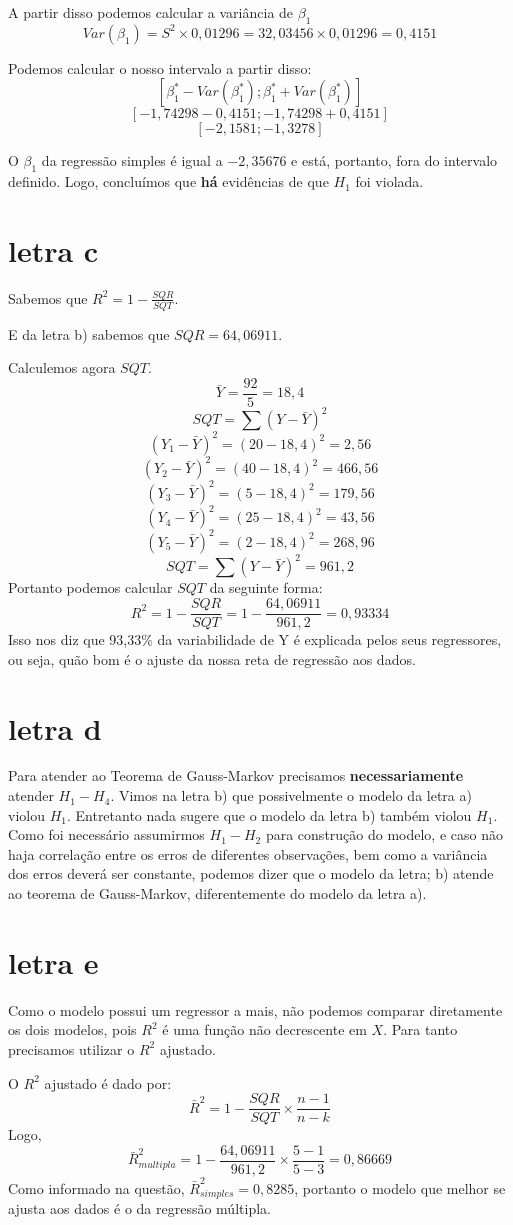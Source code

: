 A partir disso podemos calcular a variância de \(\beta_{1}\)
\[ Var(\beta_{1}) = S^{2} \times 0,01296 = 32,03456 \times 0,01296 = 0,4151\]

Podemos calcular o nosso intervalo a partir disso:
\[ [\beta^{*}_{1}-Var(\beta^{*}_{1});\beta^{*}_{1}+Var(\beta^{*}_{1})]\]
\[[-1,74298-0,4151;-1,74298+0,4151]\]
\[[-2,1581;-1,3278]\]

O \(\beta_{1}\) da regressão simples é igual a \(-2,35676\) e está, portanto, fora do intervalo definido. Logo, concluímos que \textbf{há} evidências de que \(H_{1}\) foi violada.

\section{letra c}
Sabemos que \(R^{2} = 1 - \frac{SQR}{SQT}\).

E da letra b) sabemos que \(SQR = 64,06911\).

Calculemos agora \(SQT\).
\[\bar{Y} = \frac{92}{5} = 18,4\]
\[SQT = \sum (Y - \bar{Y})^{2}\]
\[(Y_{1} - \bar{Y})^2 = (20 - 18,4)^2 = 2,56\]
\[(Y_{2} - \bar{Y})^2 = (40 - 18,4)^2 = 466,56\]
\[(Y_{3} - \bar{Y})^2 = (5 - 18,4)^2 = 179,56\]
\[(Y_{4} - \bar{Y})^2 = (25 - 18,4)^2 = 43,56\]
\[(Y_{5} - \bar{Y})^2 = (2 - 18,4)^2 = 268,96\]
\[SQT = \sum (Y - \bar{Y})^{2} = 961,2\]
Portanto podemos calcular \(SQT\) da seguinte forma:
\[R^{2} = 1 - \frac{SQR}{SQT} = 1 - \frac{64,06911}{961,2} = 0,93334\]
Isso nos diz que 93,33\% da variabilidade de Y é explicada pelos seus regressores, ou seja, quão bom é o ajuste da nossa reta de regressão aos dados.

\section{letra d}
Para atender ao Teorema de Gauss-Markov precisamos \textbf{necessariamente} atender \(H_{1}-H_{4}\). Vimos na letra b) que possivelmente  o modelo da letra a) violou \(H_{1}\). Entretanto nada sugere que o modelo da letra b) também violou \(H_{1}\). Como foi necessário assumirmos \(H_{1}-H_{2}\) para construção do modelo, e caso não haja correlação entre os erros de diferentes observações, bem como a variância dos erros deverá ser constante, podemos dizer que o modelo da letra; b) atende ao teorema de Gauss-Markov, diferentemente do modelo da letra a).

\section{letra e}
Como o modelo possui um regressor a mais, não podemos comparar diretamente os dois modelos, pois \(R^{2}\) é uma função não decrescente em \(X\). Para tanto precisamos utilizar o \(R^{2}\) ajustado.

O \(R^{2}\) ajustado é dado por:
\[ \bar{R}^{2} = 1 - \frac{SQR}{SQT} \times \frac{n - 1}{n - k}\]
Logo,
\[\bar{R}^{2}_{multipla} = 1 - \frac{64,06911}{961,2} \times \frac{5 - 1}{5 - 3} = 0,86669\]
Como informado na questão, \(\bar{R}^{2}_{simples} = 0,8285\), portanto o modelo que melhor se ajusta aos dados é o da regressão múltipla.
